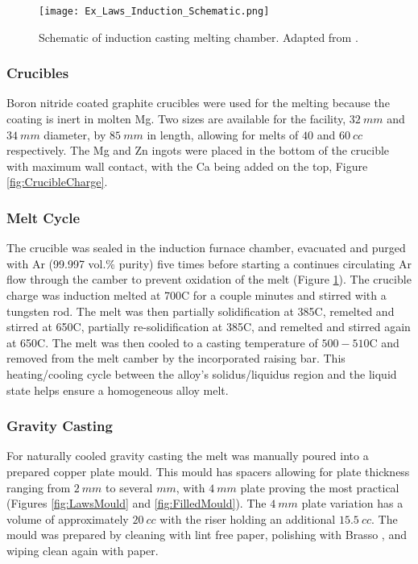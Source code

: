 \documentclass[a4paper,12pt,oneside]{report}%
\begin{document}
\begin{figure}[htbp]
	\centering
	\texttt{[image: Ex\_Laws\_Induction\_Schematic.png]}
	\caption[Schematic of induction casting melting chamber.]{Schematic of induction casting melting chamber. Adapted from \cite{Laws2007}.}
	\label{fig:CastingSchematic}
\end{figure}

\subsubsection{Crucibles}
Boron nitride coated graphite crucibles were used for the melting because the coating is inert in molten Mg. Two sizes are available for the facility, $32~ mm$ and $34~ mm$ diameter, by $85~ mm$ in length, allowing for melts of $40$ and $60~ cc$ respectively. The Mg and Zn ingots were placed in the bottom of the crucible with maximum wall contact, with the Ca being added on the top, Figure \ref{fig:CrucibleCharge}.

\subsubsection{Melt Cycle}
The crucible was sealed in the induction furnace chamber, evacuated and purged with Ar (99.997 vol.\% purity) five times before starting a continues circulating Ar flow through the camber to prevent oxidation of the melt (Figure \ref{fig:CastingSchematic}). The crucible charge was induction melted at 700\degree C for a couple minutes and stirred with a tungsten rod. The melt was then partially solidification at 385\degree C, remelted and stirred at 650\degree C, partially re-solidification at 385\degree C, and remelted and stirred again at 650\degree C. The melt was then cooled to a casting temperature of $500- 510$\degree C and removed from the melt camber by the incorporated raising bar. This heating/cooling cycle between the alloy's solidus/liquidus region and the liquid state helps ensure a homogeneous alloy melt. 

\subsubsection{Gravity Casting}
For naturally cooled gravity casting the melt was manually poured into a prepared copper plate mould. This mould has spacers allowing for plate thickness ranging from $2~ mm$ to several $mm$, with $4~ mm$ plate proving the most practical (Figures \ref{fig:LawsMould} and \ref{fig:FilledMould}). The $4~ mm$ plate variation has a volume of approximately $20~ cc$ with the riser holding an additional $15.5~ cc$. The mould was prepared by cleaning with lint free paper, polishing with Brasso \textcopyright, and wiping clean again with paper.
\end{document}
